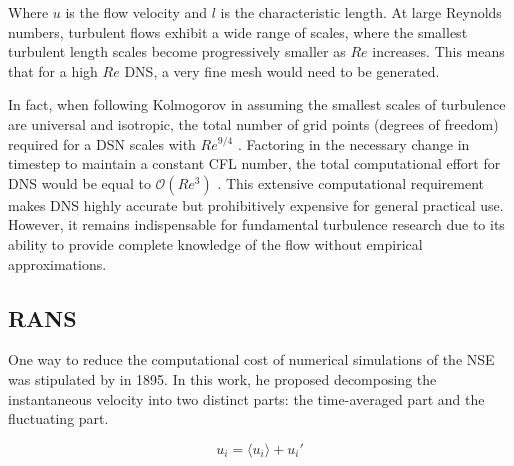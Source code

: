 Where $u$ is the flow velocity and $l$ is the characteristic length. At large Reynolds numbers, turbulent flows exhibit a wide range of scales, where the smallest turbulent length scales become progressively smaller as $Re$ increases. This means that for a high $Re$ DNS, a very fine mesh would need to be generated. 

In fact, when following Kolmogorov in assuming the smallest scales of turbulence are universal and isotropic, the total number of grid points (degrees of freedom) required for a DSN scales with $Re^{9/4}$ \cite{Coleman2010}. Factoring in the necessary change in timestep to maintain a constant CFL number, the total computational effort for DNS would be equal to $\mathcal{O}(Re^3)$ \cite{Coleman2010}. This extensive computational requirement makes DNS highly accurate but prohibitively expensive for general practical use. However, it remains indispensable for fundamental turbulence research due to its ability to provide complete knowledge of the flow without empirical approximations.


\subsection{RANS}
One way to reduce the computational cost of numerical simulations of the NSE was stipulated by \textcite{Reynolds1895} in 1895. In this work, he proposed decomposing the instantaneous velocity into two distinct parts: the time-averaged part and the fluctuating part. 

\begin{equation}\label{eq: ReDecompose}
    u_i = \langle u_i \rangle + u_i'
\end{equation}



